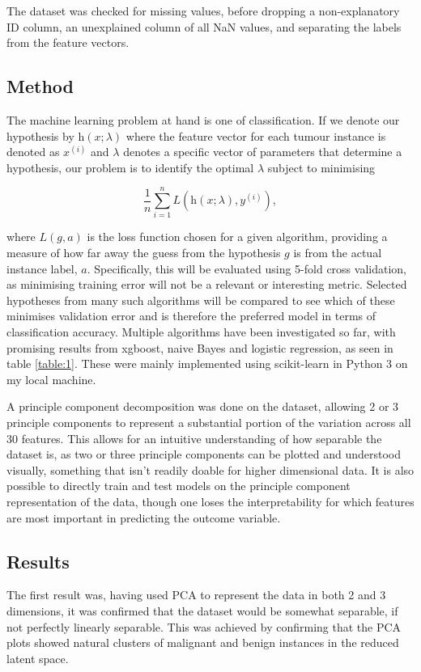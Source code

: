 \documentclass[11pt]{article}
\begin{document}
The dataset was checked for missing values, before dropping a non-explanatory ID column, an unexplained column of all NaN values, and separating the labels from the feature vectors.


\subsection{Method}

The machine learning problem at hand is one of classification. If we denote our hypothesis by $\text{h}(x; \lambda)$ where the feature vector for each tumour instance is denoted as $x^{(i)}$ and $\lambda$ denotes a specific vector of parameters that determine a hypothesis, our problem is to identify the optimal $\lambda$ subject to minimising

$$\frac{1}{n}\sum_{i=1}^{n} L(\text{h}(x; \lambda), y^{(i)}),$$

where $L(g, a)$ is the loss function chosen for a given algorithm, providing a measure of how far away the guess from the hypothesis $g$ is from the actual instance label, $a$. Specifically, this will be evaluated using 5-fold cross validation, as minimising training error will not be a relevant or interesting metric. Selected hypotheses from many such algorithms will be compared to see which of these minimises validation error and is therefore the preferred model in terms of classification accuracy. Multiple algorithms have been investigated so far, with promising results from xgboost, naive Bayes and logistic regression, as seen in table \ref{table:1}. These were mainly implemented using scikit-learn in Python 3 on my local machine.

A principle component decomposition was done on the dataset, allowing 2 or 3 principle components to represent a substantial portion of the variation across all 30 features. This allows for an intuitive understanding of how separable the dataset is, as two or three principle components can be plotted and understood visually, something that isn't readily doable for higher dimensional data. It is also possible to directly train and test models on the principle component representation of the data, though one loses the interpretability for which features are most important in predicting the outcome variable.

\subsection{Results}
The first result was, having used PCA to represent the data in both 2 and 3 dimensions, it was confirmed that the dataset would be somewhat separable, if not perfectly linearly separable. This was achieved by confirming that the PCA plots showed natural clusters of malignant and benign instances in the reduced latent space.
\end{document}
